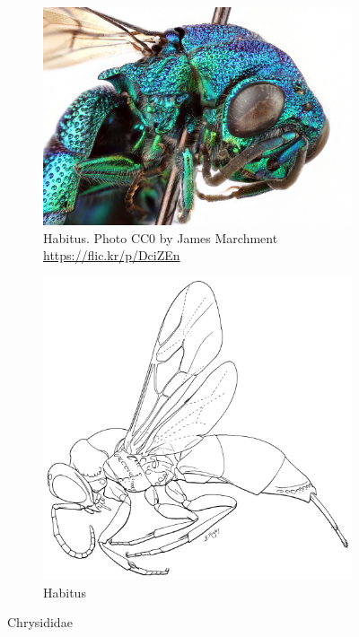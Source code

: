 \documentclass[letterpaper, 11pt]{article}
\begin{document}
\begin{figure}[ht!]
    \centering
    \begin{subfigure}[ht!]{0.42\textwidth}
        \includegraphics[width=\textwidth]{ChrysididColor}
        \caption{Habitus. Photo CC0 by James Marchment \url{https://flic.kr/p/DciZEn}}
        \label{fig:chrysid1}
    \end{subfigure}
    \qquad
    \begin{subfigure}[ht!]{0.39\textwidth}
        \includegraphics[width=\textwidth]{ChrysididHabitus}
        \caption{Habitus \citep[][Fig. 42]{goulet1993hymenoptera}}
        \label{fig:chrysid2}
    \end{subfigure}
    \caption{Chrysididae}\label{fig:chrysididae}
\end{figure}
\FloatBarrier
\end{document}

